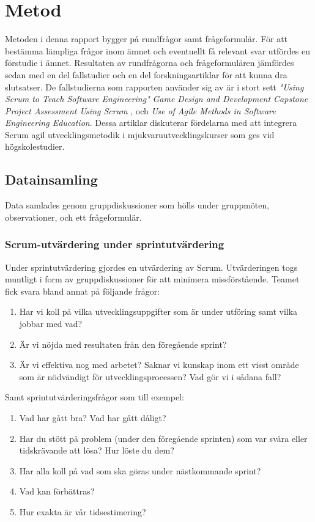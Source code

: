 \section{Metod} \label{sec:Lieth_Wahid-method}
Metoden i denna rapport bygger på rundfrågor samt frågeformulär. För att bestämma lämpliga frågor inom ämnet och eventuellt få relevant svar utfördes en förstudie i ämnet. Resultaten av rundfrågorna och frågeformulären 
jämfördes sedan med en del fallstudier och en del forskningsartiklar för att kunna dra slutsatser. De fallstudierna som rapporten använder sig av är i stort sett \textit{"Using Scrum to Teach Software Engineering"} \cite{Usingscr27:online} \textit{ Game Design and Development Capstone Project Assessment Using Scrum} \cite{GameDesign} , och \textit{Use of Agile Methods in Software Engineering Education}\cite{UseofAgi59:online}. Dessa artiklar diskuterar fördelarna med att integrera Scrum agil utvecklingsmetodik i mjukvaruutvecklingskurser som ges vid högskolestudier.  
\subsection{Datainsamling}\label{ds}
Data samlades genom gruppdiskussioner som hölls under gruppmöten, observationer, och ett frågeformulär. 
\subsubsection {Scrum-utvärdering under sprintutvärdering} \label{Lieth:scrumU}
Under sprintutvärdering gjordes en utvärdering av Scrum. Utvärderingen togs muntligt i form av gruppdiskussioner för att minimera missförstående. Teamet fick svara bland annat på följande frågor:
\begin{enumerate}
	\item Har vi koll på vilka utvecklingsuppgifter som är under utföring samt vilka jobbar med vad? 
	\item Är vi nöjda med resultaten från den föregående sprint?
	\item Är vi effektiva nog med arbetet? Saknar vi kunskap inom ett visst område som är nödvändigt för utvecklingsprocessen? Vad gör vi i sådana fall? \label{f3}
\end{enumerate} 
Samt sprintutvärderingsfrågor som till exempel:
\begin{enumerate}
	\item Vad har gått bra? Vad har gått dåligt?
	\item Har du stött på problem (under den föregående sprinten) som var svåra eller tidskrävande att lösa? Hur löste du dem?
	\item Har alla koll på vad som ska göras under nästkommande sprint?
	\item Vad kan förbättras?
	\item Hur exakta är vår tidsestimering?
\end{enumerate} 

